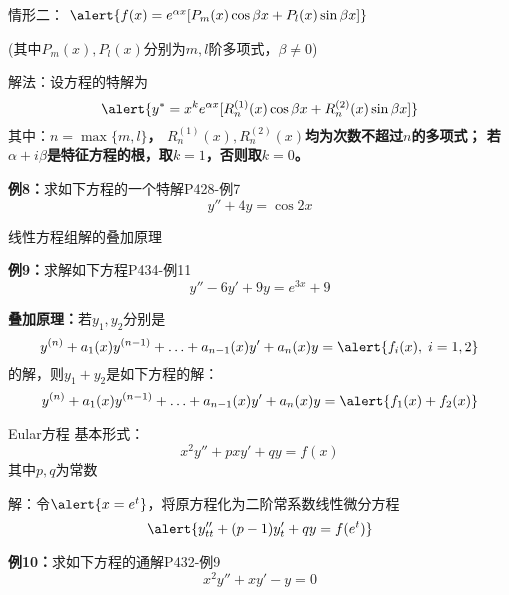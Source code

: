 \begin{frame}
	\linespread{1.2}
	{\bb 情形二：}\pause 
	$\alert{f(x)=e^{\alpha x}[P_m(x)\cos\beta x+P_l(x)\sin\beta x]}$\pause 
	
	(其中$P_m(x),P_l(x)$分别为$m,l$阶多项式，$\beta\ne 0$)\pause 
	
	{\bb 解法：}设方程的特解为
	$$\alert{y^*=x^ke^{\alpha x}[R^{(1)}_n(x)\cos\beta x+R^{(2)}_n(x)\sin\beta
	x]}$$ \pause 
	其中：\alert{\bf $n=\max\{m,l\}$，\pause
	$R^{(1)}_n(x),R^{(2)}_n(x)$均为次数不超过$n$的多项式；
	\pause 若 $\alpha+i\beta$是特征方程的根，取$k=1$，否则取$k=0$。}\pause 
	\begin{exampleblock}{{\bf 例8：}求如下方程的一个特解\hfill P428-例7}
		$$y''+4y=\cos 2x$$
	\end{exampleblock}
\end{frame}

\begin{frame}{线性方程组解的叠加原理}
	\linespread{1.2}
	\begin{exampleblock}{{\bf 例9：}求解如下方程\hfill P434-例11}
		$$y''-6y'+9y=e^{3x}+9$$
	\end{exampleblock}
	\pause
	\alert{\bf 叠加原理：}若$y_1,y_2$分别是
	$$y^{(n)}+a_1(x)y^{(n-1)}+\ldots+a_{n-1}(x)y'+a_n(x)y=\alert{f_i(x),\;i=1,2}$$
	的解，\pause 则$y_1+y_2$是如下方程的解：
	$$y^{(n)}+a_1(x)y^{(n-1)}+\ldots+a_{n-1}(x)y'+a_n(x)y=\alert{f_1(x)+f_2(x)}$$
\end{frame}

\begin{frame}{Eular方程}
	\linespread{1.2}\pause 
	{\bb 基本形式：}
	$$x^2y''+pxy'+qy=f(x)$$
	其中$p,q$为常数
	
	\pause 
	{\bb 解：}令$\alert{x=e^t}$，\pause 将原方程化为二阶常系数线性微分方程
	$$\alert{y''_{tt}+(p-1)y'_t+qy=f(e^t)}$$
	\pause 
	\vspace{-1em}
	\begin{exampleblock}{{\bf 例10：}求如下方程的通解\hfill P432-例9}
		$$x^2y''+xy'-y=0$$
	\end{exampleblock}
\end{frame}

